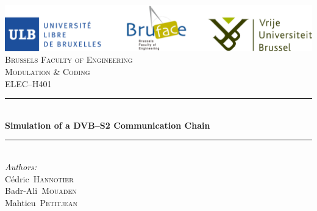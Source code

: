 \begin{titlepage}

\newcommand{\HRule}{\rule{\linewidth}{0.5mm}} %

\center %


\includegraphics[width=\textwidth]{fig/Logos}\\[2cm] %
 

\textsc{\LARGE Brussels Faculty of Engineering}\\[1.5cm] %
\textsc{\Large Modulation \& Coding}\\[0.5cm] %
\textsc{\large ELEC--H401}\\[0.5cm] %


\HRule \\[0.4cm]
{ \huge \bfseries Simulation of a DVB--S2 Communication Chain}\\[0.4cm] %
\HRule \\[1.5cm]
 

\Large \emph{Authors:}\\
Cédric~\textsc{Hannotier} \\%
Badr-Ali~\textsc{Mouaden} \\
Mahtieu~\textsc{Petitjean}\\[2.5cm] %


\end{titlepage}
